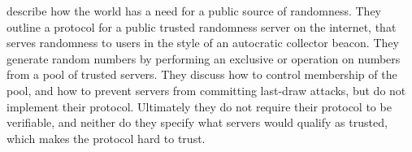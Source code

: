 \item[A Public Randomness Service]
\citet{fischer2011publicrandomnessservice} describe how the world has a need for a public source of randomness. They outline a protocol for a public trusted randomness server on the internet, that serves randomness to users in the style of an autocratic collector beacon. They generate random numbers by performing an exclusive or operation on numbers from a pool of trusted servers. They discuss how to control membership of the pool, and how to prevent servers from committing last-draw attacks, but do not implement their protocol. Ultimately they do not require their protocol to be verifiable, and neither do they specify what servers would qualify as trusted, which makes the protocol hard to trust. 